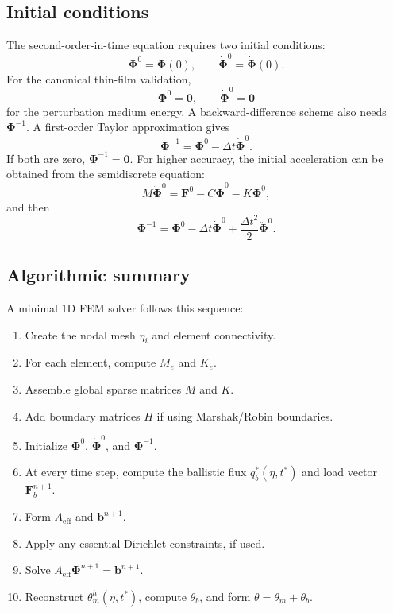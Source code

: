 \documentclass[11pt]{article}
\begin{document}
\subsection{Initial conditions}
The second-order-in-time equation requires two initial conditions:
\begin{equation}
    \bm{\Phi}^{0}=\bm{\Phi}(0),
    \qquad
    \dot{\bm{\Phi}}^{0}=\dot{\bm{\Phi}}(0).
\end{equation}
For the canonical thin-film validation,
\begin{equation}
    \bm{\Phi}^{0}=\bm{0},
    \qquad
    \dot{\bm{\Phi}}^{0}=\bm{0}
\end{equation}
for the perturbation medium energy. A backward-difference scheme also needs \(\bm{\Phi}^{-1}\). A first-order Taylor approximation gives
\begin{equation}
    \bm{\Phi}^{-1}=\bm{\Phi}^{0}-\Delta t\dot{\bm{\Phi}}^{0}.
\end{equation}
If both are zero, \(\bm{\Phi}^{-1}=\bm{0}\). For higher accuracy, the initial acceleration can be obtained from the semidiscrete equation:
\begin{equation}
    M\ddot{\bm{\Phi}}^{0}=\bm{F}^{0}-C\dot{\bm{\Phi}}^{0}-K\bm{\Phi}^{0},
\end{equation}
and then
\begin{equation}
    \bm{\Phi}^{-1}=\bm{\Phi}^{0}-\Delta t\dot{\bm{\Phi}}^{0}+\frac{\Delta t^2}{2}\ddot{\bm{\Phi}}^{0}.
\end{equation}

\subsection{Algorithmic summary}
A minimal 1D FEM solver follows this sequence:
\begin{enumerate}[leftmargin=1.6em]
    \item Create the nodal mesh \(\eta_i\) and element connectivity.
    \item For each element, compute \(M_e\) and \(K_e\).
    \item Assemble global sparse matrices \(M\) and \(K\).
    \item Add boundary matrices \(H\) if using Marshak/Robin boundaries.
    \item Initialize \(\bm{\Phi}^0\), \(\dot{\bm{\Phi}}^0\), and \(\bm{\Phi}^{-1}\).
    \item At every time step, compute the ballistic flux \(q_b^*(\eta,t^*)\) and load vector \(\bm{F}_b^{n+1}\).
    \item Form \(A_{\mathrm{eff}}\) and \(\bm{b}^{n+1}\).
    \item Apply any essential Dirichlet constraints, if used.
    \item Solve \(A_{\mathrm{eff}}\bm{\Phi}^{n+1}=\bm{b}^{n+1}\).
    \item Reconstruct \(\theta_m^h(\eta,t^*)\), compute \(\theta_b\), and form \(\theta=\theta_m+\theta_b\).
\end{enumerate}
\end{document}
